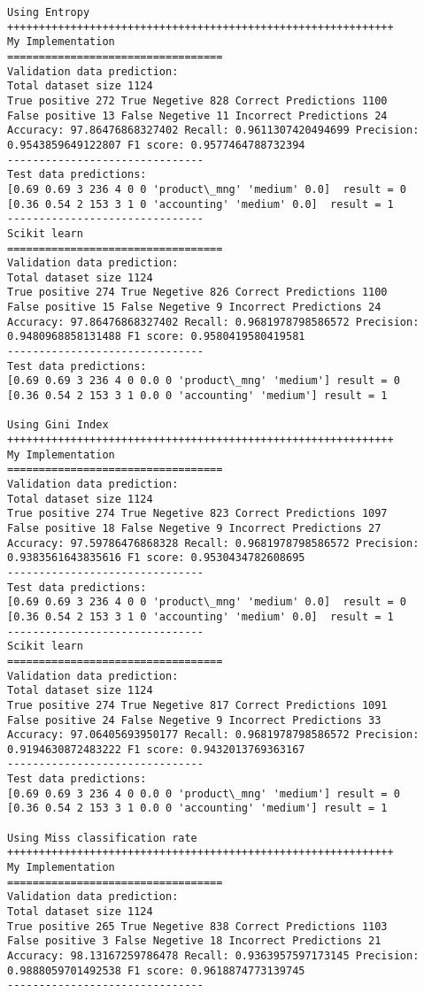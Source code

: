 \documentclass[11pt]{article}
\begin{document}
    \begin{Verbatim}[commandchars=\\\{\}]
Using Entropy
+++++++++++++++++++++++++++++++++++++++++++++++++++++++++++++
My Implementation 
==================================
Validation data prediction:
Total dataset size 1124
True positive 272 True Negetive 828 Correct Predictions 1100
False positive 13 False Negetive 11 Incorrect Predictions 24
Accuracy: 97.86476868327402 Recall: 0.9611307420494699 Precision: 0.9543859649122807 F1 score: 0.9577464788732394
-------------------------------
Test data predictions:
[0.69 0.69 3 236 4 0 0 'product\_mng' 'medium' 0.0]  result = 0
[0.36 0.54 2 153 3 1 0 'accounting' 'medium' 0.0]  result = 1
-------------------------------
Scikit learn 
==================================
Validation data prediction:
Total dataset size 1124
True positive 274 True Negetive 826 Correct Predictions 1100
False positive 15 False Negetive 9 Incorrect Predictions 24
Accuracy: 97.86476868327402 Recall: 0.9681978798586572 Precision: 0.9480968858131488 F1 score: 0.9580419580419581
-------------------------------
Test data predictions:
[0.69 0.69 3 236 4 0 0.0 0 'product\_mng' 'medium'] result = 0
[0.36 0.54 2 153 3 1 0.0 0 'accounting' 'medium'] result = 1

Using Gini Index
+++++++++++++++++++++++++++++++++++++++++++++++++++++++++++++
My Implementation 
==================================
Validation data prediction:
Total dataset size 1124
True positive 274 True Negetive 823 Correct Predictions 1097
False positive 18 False Negetive 9 Incorrect Predictions 27
Accuracy: 97.59786476868328 Recall: 0.9681978798586572 Precision: 0.9383561643835616 F1 score: 0.9530434782608695
-------------------------------
Test data predictions:
[0.69 0.69 3 236 4 0 0 'product\_mng' 'medium' 0.0]  result = 0
[0.36 0.54 2 153 3 1 0 'accounting' 'medium' 0.0]  result = 1
-------------------------------
Scikit learn 
==================================
Validation data prediction:
Total dataset size 1124
True positive 274 True Negetive 817 Correct Predictions 1091
False positive 24 False Negetive 9 Incorrect Predictions 33
Accuracy: 97.06405693950177 Recall: 0.9681978798586572 Precision: 0.9194630872483222 F1 score: 0.9432013769363167
-------------------------------
Test data predictions:
[0.69 0.69 3 236 4 0 0.0 0 'product\_mng' 'medium'] result = 0
[0.36 0.54 2 153 3 1 0.0 0 'accounting' 'medium'] result = 1

Using Miss classification rate
+++++++++++++++++++++++++++++++++++++++++++++++++++++++++++++
My Implementation 
==================================
Validation data prediction:
Total dataset size 1124
True positive 265 True Negetive 838 Correct Predictions 1103
False positive 3 False Negetive 18 Incorrect Predictions 21
Accuracy: 98.13167259786478 Recall: 0.9363957597173145 Precision: 0.9888059701492538 F1 score: 0.9618874773139745
-------------------------------

    \end{Verbatim}
\end{document}

